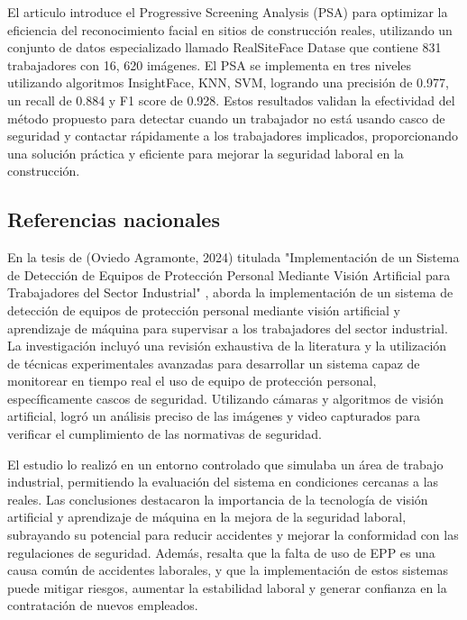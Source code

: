 \noindent
El articulo introduce el Progressive Screening Analysis (PSA) para optimizar la eficiencia del reconocimiento facial en sitios de construcción reales, utilizando un conjunto de datos especializado llamado RealSiteFace Datase que contiene 831 trabajadores con 16, 620 imágenes. El PSA se implementa en tres niveles utilizando algoritmos InsightFace, KNN, SVM, logrando una precisión de 0.977, un recall de 0.884 y F1 score de 0.928. Estos resultados validan la efectividad del método propuesto para detectar cuando un trabajador no está usando casco de seguridad y contactar rápidamente a los trabajadores implicados, proporcionando una solución práctica y eficiente para mejorar la seguridad laboral en la construcción.

\subsection{Referencias nacionales}

En la tesis de (Oviedo Agramonte, 2024) titulada "Implementación de un Sistema de Detección de Equipos de Protección Personal Mediante Visión Artificial para Trabajadores del Sector Industrial" \cite{oviedo2024implementacion}, aborda la implementación de un sistema de detección de equipos de protección personal mediante visión artificial y aprendizaje de máquina para supervisar a los trabajadores del sector industrial. La investigación incluyó una revisión exhaustiva de la literatura y la utilización de técnicas experimentales avanzadas para desarrollar un sistema capaz de monitorear en tiempo real el uso de equipo de protección personal, específicamente cascos de seguridad. Utilizando cámaras y algoritmos de visión artificial, logró un análisis preciso de las imágenes y video capturados para verificar el cumplimiento de las normativas de seguridad.

\noindent
El estudio lo realizó en un entorno controlado que simulaba un área de trabajo industrial, permitiendo la evaluación del sistema en condiciones cercanas a las reales. Las conclusiones destacaron la importancia de la tecnología de visión artificial y aprendizaje de máquina en la mejora de la seguridad laboral, subrayando su potencial para reducir accidentes y mejorar la conformidad con las regulaciones de seguridad. Además, resalta que la falta de uso de EPP es una causa común de accidentes laborales, y que la implementación de estos sistemas puede mitigar riesgos, aumentar la estabilidad laboral y generar confianza en la contratación de nuevos empleados.

